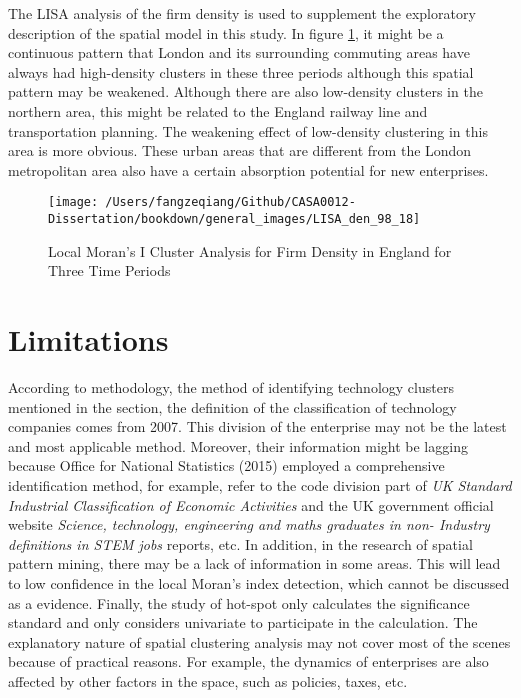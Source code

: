 \documentclass[
  12pt,
  oneside]{book}
\begin{document}
The LISA analysis of the firm density is used to supplement the exploratory description of the spatial model in this study. In figure \ref{fig:fig-lisa-den}, it might be a continuous pattern that London and its surrounding commuting areas have always had high-density clusters in these three periods although this spatial pattern may be weakened. Although there are also low-density clusters in the northern area, this might be related to the England railway line and transportation planning. The weakening effect of low-density clustering in this area is more obvious. These urban areas that are different from the London metropolitan area also have a certain absorption potential for new enterprises.

\begin{figure}
\texttt{[image: /Users/fangzeqiang/Github/CASA0012-Dissertation/bookdown/general\_images/LISA\_den\_98\_18]} \caption{Local Moran's I Cluster Analysis for Firm Density in England for Three Time Periods}\label{fig:fig-lisa-den}
\end{figure}

\hypertarget{limitations-1}{%
\section{Limitations}\label{limitations-1}}

According to methodology, the method of identifying technology clusters mentioned in the section, the definition of the classification of technology companies comes from 2007. This division of the enterprise may not be the latest and most applicable method. Moreover, their information might be lagging because Office for National Statistics (2015) employed a comprehensive identification method, for example, refer to the code division part of \emph{UK Standard Industrial Classification of Economic Activities} and the UK government official website \emph{Science, technology, engineering and maths graduates in non- Industry definitions in STEM jobs} reports, etc. In addition, in the research of spatial pattern mining, there may be a lack of information in some areas. This will lead to low confidence in the local Moran's index detection, which cannot be discussed as a evidence. Finally, the study of hot-spot only calculates the significance standard and only considers univariate to participate in the calculation. The explanatory nature of spatial clustering analysis may not cover most of the scenes because of practical reasons. For example, the dynamics of enterprises are also affected by other factors in the space, such as policies, taxes, etc.
\end{document}
